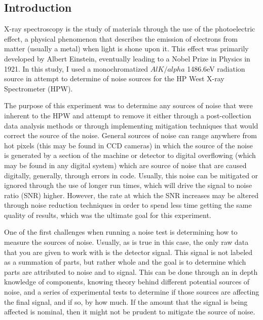 \documentclass[twoside]{article}
\begin{document}
\begin{multicols}{2}

\section{Introduction}

\lettrine[nindent=0em,lines=3]{X}
-ray spectroscopy is the study of materials through the use of the photoelectric effect, a physical phenomenon that describes the emission of electrons from matter (usually a metal) when light is shone upon it. This effect was primarily developed by Albert Einstein, eventually leading to a Nobel Prize in Physics in 1921.  In this study, I used a monochromatized $AlK/alpha$ 1486.6eV radiation source in attempt to determine of noise sources for the HP West X-ray Spectrometer (HPW).  

\vspace{5mm}

The purpose of this experiment was to determine any sources of noise that were inherent to the HPW and attempt to remove it either through a post-collection data analysis methods or through implementing mitigation techniques that would correct the source of the noise. General sources of noise can range anywhere from hot pixels (this may be found in CCD cameras) in which the source of the noise is generated by a section of the machine or detector to digital overflowing (which may be found in any digital system) which are source of noise that are caused digitally, generally, through errors in code. Usually, this noise can be mitigated or ignored through the use of longer run times, which will drive the signal to noise ratio (SNR) higher. However, the rate at which the SNR increases may be altered through noise reduction techniques in order to spend less time getting the same quality of results, which was the ultimate goal for this experiment.


\vspace{5mm}


One of the first challenges when running a noise test is determining how to measure the sources of noise.  Usually, as is true in this case, the only raw data that you are given to work with is the detector signal.  This signal is not labeled as a summation of parts, but rather whole and the goal is to determine which parts are attributed to noise and to signal.  This can be done through an in depth knowledge of components, knowing theory behind different potential sources of noise, and  a series of experimental tests to determine if those sources are affecting the final signal, and if so, by how much.  If the amount that the signal is being affected is nominal, then it might not be prudent to mitigate the source of noise.



\end{multicols}
\end{document}
